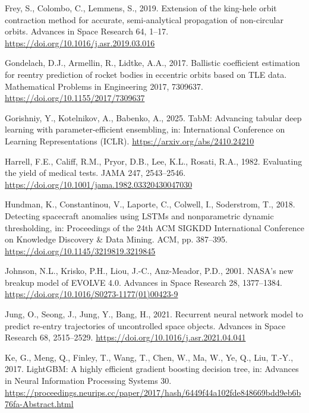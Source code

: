 \documentclass[
]{article}
\newlength{\cslhangindent}
\newenvironment{CSLReferences}[2] %
 {\begin{list}{}{%
  \setlength{\itemindent}{0pt}
  \setlength{\leftmargin}{0pt}
  \setlength{\parsep}{0pt}
  \ifodd #1
   \setlength{\leftmargin}{\cslhangindent}
   \setlength{\itemindent}{-1\cslhangindent}
  \fi
  \setlength{\itemsep}{#2\baselineskip}}}
 {\end{list}}
\begin{document}
\begin{CSLReferences}{1}{0}
Frey, S., Colombo, C., Lemmens, S., 2019. Extension of the king-hele
orbit contraction method for accurate, semi-analytical propagation of
non-circular orbits. Advances in Space Research 64, 1--17.
\url{https://doi.org/10.1016/j.asr.2019.03.016}

Gondelach, D.J., Armellin, R., Lidtke, A.A., 2017. Ballistic coefficient
estimation for reentry prediction of rocket bodies in eccentric orbits
based on TLE data. Mathematical Problems in Engineering 2017, 7309637.
\url{https://doi.org/10.1155/2017/7309637}

Gorishniy, Y., Kotelnikov, A., Babenko, A., 2025. {TabM}: Advancing
tabular deep learning with parameter-efficient ensembling, in:
International Conference on Learning Representations (ICLR).
\url{https://arxiv.org/abs/2410.24210}

Harrell, F.E., Califf, R.M., Pryor, D.B., Lee, K.L., Rosati, R.A., 1982.
Evaluating the yield of medical tests. JAMA 247, 2543--2546.
\url{https://doi.org/10.1001/jama.1982.03320430047030}

Hundman, K., Constantinou, V., Laporte, C., Colwell, I., Soderstrom, T.,
2018. Detecting spacecraft anomalies using {LSTMs} and nonparametric
dynamic thresholding, in: Proceedings of the 24th {ACM SIGKDD}
International Conference on Knowledge Discovery \& Data Mining. ACM, pp.
387--395. \url{https://doi.org/10.1145/3219819.3219845}

Johnson, N.L., Krisko, P.H., Liou, J.-C., Anz-Meador, P.D., 2001.
{NASA}'s new breakup model of {EVOLVE} 4.0. Advances in Space Research
28, 1377--1384. \url{https://doi.org/10.1016/S0273-1177(01)00423-9}

Jung, O., Seong, J., Jung, Y., Bang, H., 2021. Recurrent neural network
model to predict re-entry trajectories of uncontrolled space objects.
Advances in Space Research 68, 2515--2529.
\url{https://doi.org/10.1016/j.asr.2021.04.041}

Ke, G., Meng, Q., Finley, T., Wang, T., Chen, W., Ma, W., Ye, Q., Liu,
T.-Y., 2017. {LightGBM}: A highly efficient gradient boosting decision
tree, in: Advances in Neural Information Processing Systems 30.
\url{https://proceedings.neurips.cc/paper/2017/hash/6449f44a102fde848669bdd9eb6b76fa-Abstract.html}


\end{CSLReferences}
\end{document}
